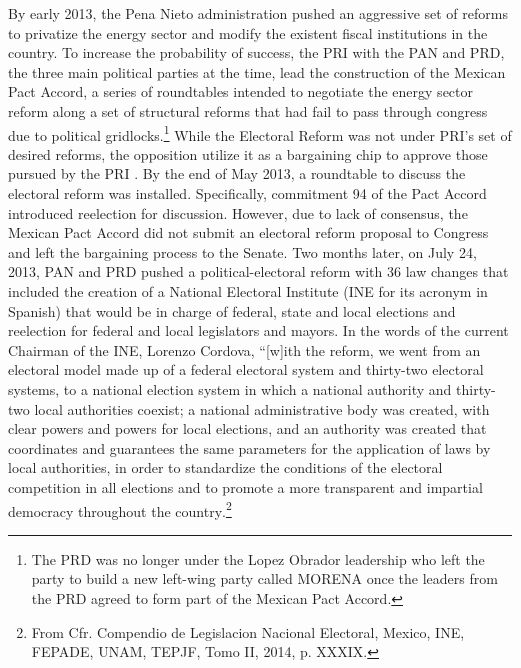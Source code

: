 \documentclass[12pt]{amsart}
\numberwithin{equation}{section}
\theoremstyle{definition}
\theoremstyle{definition}
\theoremstyle{definition}
\begin{document}
\begin{appendix}
By early 2013, the Pena Nieto administration pushed an aggressive set of reforms to privatize the energy sector and modify the existent fiscal institutions in the country. To increase the probability of success, the PRI with the PAN and PRD, the three main political parties at the time, lead the construction of the Mexican Pact Accord, a series of roundtables intended to negotiate the energy sector reform along a set of structural reforms that had fail to pass through congress due to political gridlocks.\footnote{The PRD was no longer under the Lopez Obrador leadership who left the party to build a new left-wing party called MORENA once the leaders from the PRD agreed to form part of the Mexican Pact Accord.} While the Electoral Reform was not under PRI's set of desired reforms, the opposition utilize it as a bargaining chip to approve those pursued by the PRI \citep{zamitiz_2017}. By the end of May 2013, a roundtable to discuss the electoral reform was installed. Specifically, commitment 94 of the Pact Accord introduced reelection for discussion. However, due to lack of consensus, the Mexican Pact Accord did not submit an electoral reform proposal to Congress and left the bargaining process to the Senate. Two months later, on July 24, 2013, PAN and PRD pushed a political-electoral reform with 36 law changes that included  the creation of a National Electoral Institute (INE for its acronym in Spanish) that would be in charge of federal, state and local elections and reelection for federal and local legislators and mayors. In the words of the current Chairman of the INE, Lorenzo Cordova, ``[w]ith the reform, we went from an electoral model made up of a federal electoral system and thirty-two electoral systems, to a national election system in which a national authority and thirty-two local authorities coexist; a national administrative body was created, with clear powers and powers for local elections, and an authority was created that coordinates and guarantees the same parameters for the application of laws by local authorities, in order to standardize the conditions of the electoral competition in all elections and to promote a more transparent and impartial democracy throughout the country.\footnote{From Cfr. Compendio de Legislacion Nacional Electoral, Mexico, INE, FEPADE, UNAM, TEPJF, Tomo II, 2014, p. XXXIX.} 



\end{appendix}
\end{document}
